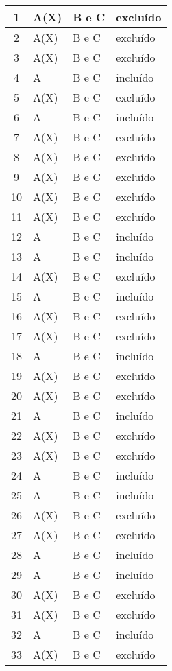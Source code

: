 \documentclass[12pt, a4paper]{article}
\begin{document}
\begin{longtable}{|c|l|l|l|}
	   	1	&	A(X)	&	B e C	& excluído	\\  \hline
		2	&	A(X)	&	B e C	& excluído	\\  \hline
		3	&	A(X)&	B e C	& excluído	\\  \hline
		4	&	A   &	B e C	& incluído	\\  \hline
		5	&	A(X)&	B e C	& excluído	\\  \hline
		6	&	A   &	B e C	& incluído	\\  \hline
		7	&	A(X)&	B e C	& excluído	\\  \hline
		8	&	A(X)&	B e C	& excluído	\\  \hline
		9	&	A(X)&	B e C	& excluído	\\  \hline
		10	&	A(X)&	B e C	& excluído	\\  	\hline
		11	&	A(X)	&	B e C	& excluído	\\  \hline
		12	&	A	&	B e C	& incluído	\\  \hline
		13	&	A	&	B e C	& incluído	\\  \hline
		14	&	A(X)&	B e C	& excluído	\\  	\hline
		15	&	A	&	B e C	& incluído	\\  \hline
		16	&	A(X)&	B e C	& excluído	\\  \hline
		17	&	A(X)&	B e C	& excluído	\\  \hline
		18	&	A	&	B e C	& incluído	\\  \hline
		19	&	A(X)&	B e C	& excluído	\\  \hline
		20	&	A(X)&	B e C	& excluído	\\  \hline
		21	&	A	&	B e C	& incluído	\\  \hline
		22	&	A(X)&	B e C	& excluído	\\  \hline
		23	&	A(X)&	B e C	& excluído	\\  \hline
		24	&	A	&	B e C	& incluído	\\  \hline
		25	&	A	&	B e C	& incluído	\\  \hline
		26	&	A(X)&	B e C	& excluído	\\  \hline
		27	&	A(X)&	B e C	& excluído	\\  \hline
		28	&	A	&	B e C	& incluído	\\  \hline
		29	&	A	&	B e C	& incluído	\\  \hline
		30	&	A(X)	&	B e C	& excluído	\\  \hline
		31	&	A(X)	&	B e C	& excluído	\\  \hline
		32	&	A	&	B e C	& incluído	\\  \hline
		33	&	A(X)&	B e C	& excluído	\\  \hline

\end{longtable}
\end{document}
